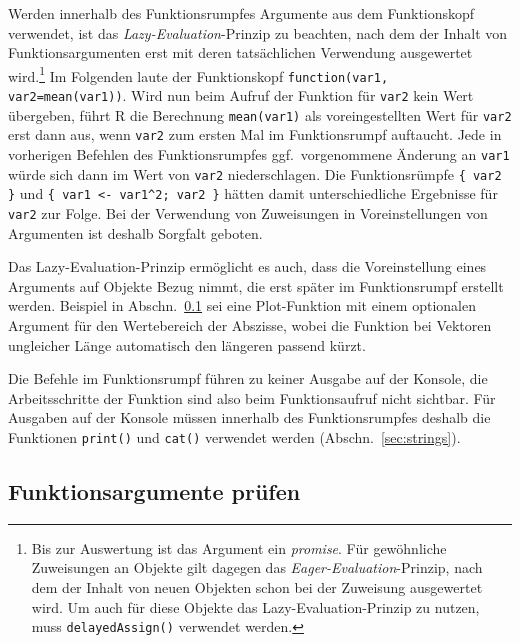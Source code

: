 Werden innerhalb des Funktionsrumpfes Argumente aus dem Funktionskopf verwendet, ist das \emph{Lazy-Evaluation}-Prinzip zu beachten, nach dem der Inhalt von Funktionsargumenten erst mit deren tatsächlichen Verwendung ausgewertet wird.\footnote{Bis zur Auswertung ist das Argument ein \emph{promise}. Für gewöhnliche Zuweisungen an Objekte gilt dagegen das \emph{Eager-Evaluation}-Prinzip, nach dem der Inhalt von neuen Objekten schon bei der Zuweisung ausgewertet wird. Um auch für diese Objekte das Lazy-Evaluation-Prinzip zu nutzen, muss  \lstinline!delayedAssign()! verwendet werden.} Im Folgenden laute der Funktionskopf \lstinline!function(var1, var2=mean(var1))!. Wird nun beim Aufruf der Funktion für \lstinline!var2! kein Wert übergeben, führt R die Berechnung \lstinline!mean(var1)! als voreingestellten Wert für \lstinline!var2! erst dann aus, wenn \lstinline!var2! zum ersten Mal im Funktionsrumpf auftaucht. Jede in vorherigen Befehlen des Funktionsrumpfes ggf.\ vorgenommene Änderung an \lstinline!var1! würde sich dann im Wert von \lstinline!var2! niederschlagen. Die Funktionsrümpfe \lstinline!{ var2 }! und \lstinline!{ var1 <- var1^2; var2 }! hätten damit unterschiedliche Ergebnisse für \lstinline!var2! zur Folge. Bei der Verwendung von Zuweisungen in Voreinstellungen von Argumenten ist deshalb Sorgfalt geboten.

Das Lazy-Evaluation-Prinzip ermöglicht es auch, dass die Voreinstellung eines Arguments auf Objekte Bezug nimmt, die erst später im Funktionsrumpf erstellt werden. Beispiel in Abschn.\ \ref{sec:checkArgs} sei eine Plot-Funktion mit einem optionalen Argument für den Wertebereich der Abszisse, wobei die Funktion bei Vektoren ungleicher Länge automatisch den längeren passend kürzt.

Die Befehle im Funktionsrumpf führen zu keiner Ausgabe auf der Konsole, die Arbeitsschritte der Funktion sind also beim Funktionsaufruf nicht sichtbar. Für Ausgaben auf der Konsole müssen innerhalb des Funktionsrumpfes deshalb die Funktionen \lstinline!print()! und \lstinline!cat()! verwendet werden (Abschn.\ \ref{sec:strings}).

\subsection{Funktionsargumente prüfen}
\label{sec:checkArgs}

